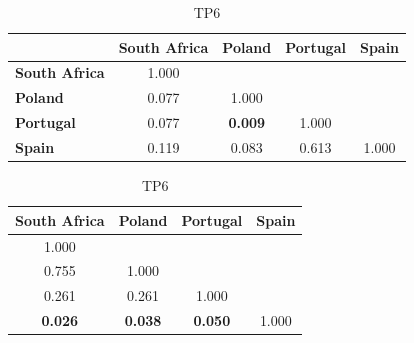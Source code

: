 \begin{table}
    \scriptsize
    \centering
    \setlength\tabcolsep{2pt}
    \begin{subtable}{.44\textwidth}
        \centering
        \begin{tabular}{lcccc}
            \toprule
                                  & \textbf{South Africa} & \textbf{Poland}                        & \textbf{Portugal} & \textbf{Spain} \\
            \midrule
            \textbf{South Africa} & 1.000                 &                                        &                   &                \\
            \textbf{Poland}       & 0.077                 & 1.000                                  &                   &                \\
            \textbf{Portugal}     & 0.077                 & \cellcolor[HTML]{EFEFEF}\textbf{0.009} & 1.000             &                \\
            \textbf{Spain}        & 0.119                 & 0.083                                  & 0.613             & 1.000          \\
            \bottomrule
        \end{tabular}
        \caption{TP6}
    \end{subtable}%
    \begin{subtable}{.44\textwidth}
        \centering
        \begin{tabular}{cccc}
            \toprule
            \textbf{South Africa}                  & \textbf{Poland}                        & \textbf{Portugal}                      & \textbf{Spain} \\
            \midrule
            1.000                                  &                                        &                                        &                \\
            0.755                                  & 1.000                                  &                                        &                \\
            0.261                                  & 0.261                                  & 1.000                                  &                \\
            \cellcolor[HTML]{EFEFEF}\textbf{0.026} & \cellcolor[HTML]{EFEFEF}\textbf{0.038} & \cellcolor[HTML]{EFEFEF}\textbf{0.050} & 1.000          \\
            \bottomrule
        \end{tabular}

\end{subtable}
\end{table}
